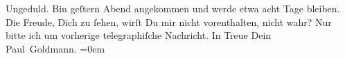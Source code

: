\begin{ledgroupsized}[t]{13cm}
               Ungeduld. Bin geſtern{ }Abend angekommen und werde etwa acht Tage bleiben. Die Freude, Dich zu
               ſehen, wirſt Du mir nicht vorenthalten, nicht wahr? Nur bitte ich um vorherige
               telegraphiſche Nachricht. In Treue\pend
           \pstart
           Dein {\\[\baselineskip]}\spacefill\mbox{Paul Goldmann.}\pend
           \leftskip=0em{}\endnumbering{}\end{ledgroupsized}\begin{anhang}\end{anhang}\newcommand{\dateiname}{L02715}\newcommand{\titel}{Paul Goldmann an Arthur Schnitzler, 12. 9. [1893]}\newcommand{\editorInnen}{Martin Anton Müller und Laura Untner}
            \footnotesize
\begin{ledgroupsized}[t]{11.5cm}
\end{ledgroupsized}
         
      